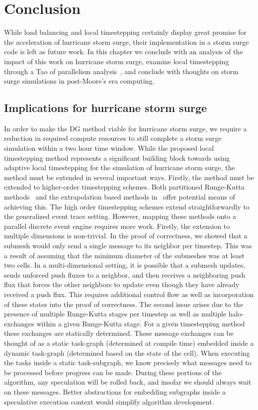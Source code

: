 \chapter{Conclusion}

While load balancing and local timestepping certainly display great promise for the acceleration of hurricane storm surge, their implementation in a storm surge code is left as future work. In this chapter we conclude with an analysis of the impact of this work on hurricane storm surge, examine local timestepping through a Tao of parallelism analysis~\cite{Pingali2011}, and conclude with thoughts on storm surge simulations in post-Moore's era computing.

\section{Implications for hurricane storm surge}
In order to make the DG method viable for hurricane storm surge, we require a reduction in required compute resources to still complete a storm surge simulation within a two hour time window. While the proposed local timestepping method represents a significant building block towards using adaptive local timestepping for the simulation of hurricane storm surge, the method must be extended in several important ways. Firstly, the method must be extended to higher-order timestepping schemes. Both partitioned Runge-Kutta methods~\cite{Constantinescu2007} and the extrapolation based methods in~\cite{Hoang2019} offer potential means of achieving this. The high order timestepping schemes extend straightforwardly to the  generalized event trace setting. However, mapping these methods onto a parallel discrete event engine requires more work. Firstly, the extension to multiple dimensions is non-trivial. In the proof of correctness, we showed that a submesh would only send a single message to its neighbor per timestep. This was a result of assuming that the minimum diameter of the submeshes was at least two cells. In a multi-dimensional setting, it is possible that a submesh updates, sends unforced push fluxes to a neighbor, and then receives a neighboring push flux that forces the other neighbors to update even though they have already received a push flux. This requires additional control flow as well as incorporation of these states into the proof of correctness.
The second issue arises due to the presence of multiple Runge-Kutta stages per timestep as well as multiple halo-exchanges within a given Runge-Kutta stage. For a given timestepping method these exchanges are statically determined. These message exchanges can be thought of as a static task-graph (determined at compile time) embedded inside a dynamic task-graph (determined based on the state of the cell). When executing the tasks inside a static task-subgraph, we know precisely what messages need to be processed before progress can be made. During these portions of the algorithm, any speculation will be rolled back, and insofar we should always wait on these messages. Better abstractions for embedding subgraphs inside a speculative execution context would simplify algorithm development.

